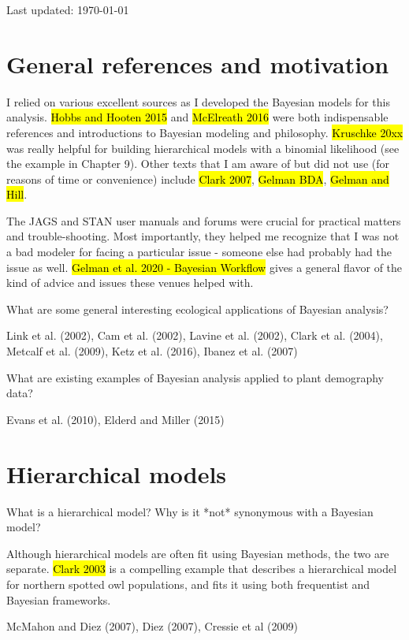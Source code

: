 \documentclass[12pt, oneside, titlepage]{article}   	%
\begin{document}
 

Last updated: \today

\section*{General references and motivation}

I relied on various excellent sources as I developed the Bayesian models for this analysis. \hl{Hobbs and Hooten 2015} and \hl{McElreath 2016} were both indispensable references and introductions to Bayesian modeling and philosophy. \hl{Kruschke 20xx} was really helpful for building hierarchical models with a binomial likelihood (see the example in Chapter 9). Other texts that I am aware of but did not use (for reasons of time or convenience) include \hl{Clark 2007}, \hl{Gelman BDA}, \hl{Gelman and Hill}.

The JAGS and STAN user manuals and forums were crucial for practical matters and trouble-shooting. Most importantly, they helped me recognize that I was not a bad modeler for facing a particular issue - someone else had probably had the issue as well. \hl{Gelman et al. 2020 - Bayesian Workflow} gives a general flavor of the kind of advice and issues these venues helped with.

What are some general interesting ecological applications of Bayesian analysis?

Link et al. (2002), Cam et al. (2002), Lavine et al. (2002), Clark et al. (2004), Metcalf et al. (2009), Ketz et al. (2016), Ibanez et al. (2007)

What are existing examples of Bayesian analysis applied to plant demography data?

Evans et al. (2010), Elderd and Miller (2015)

\section*{Hierarchical models}

What is a hierarchical model? Why is it *not* synonymous with a Bayesian model?

Although hierarchical models are often fit using Bayesian methods, the two are separate. \hl{Clark 2003} is a compelling example that describes a hierarchical model for northern spotted owl populations, and fits it using both frequentist and Bayesian frameworks. 

McMahon and Diez (2007), Diez (2007), Cressie et al (2009)
\end{document}
